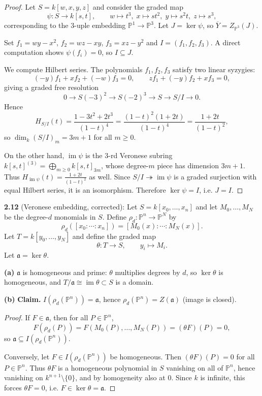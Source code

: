 \documentclass[12pt]{article}
\numberwithin{thm}{subsection}
\numberwithin{defn}{subsection}
\numberwithin{lemma}{subsection}
\numberwithin{example}{subsection}
\numberwithin{notation}{subsection}
\numberwithin{cor}{subsection}
\numberwithin{remark}{subsection}
\numberwithin{condition}{subsection}
\numberwithin{question}{subsection}
\numberwithin{construction}{subsection}
\numberwithin{construction}{subsection}
\numberwithin{construction}{subsection}
\begin{document}
\begin{proof}
Let $S=k[w,x,y,z]$ and consider the graded map
\[
\psi:S\to k[s,t],\qquad
w\mapsto t^3,\; x\mapsto st^2,\; y\mapsto s^2t,\; z\mapsto s^3,
\]
corresponding to the $3$-uple embedding $\mathbb P^1\to\mathbb P^3$.
Let $J=\ker\psi$, so $\overline Y=Z_{\mathbb P^3}(J)$.

Set $f_1=wy-x^2$, $f_2=wz-xy$, $f_3=xz-y^2$ and $I=(f_1,f_2,f_3)$.
A direct computation shows $\psi(f_i)=0$, so $I\subseteq J$.

We compute Hilbert series. The polynomials $f_1,f_2,f_3$ satisfy two linear syzygies:
\[
(-y)f_1 + x f_2 + (-w)f_3 = 0,\qquad
z f_1 + (-y)f_2 + x f_3 = 0,
\]
giving a graded free resolution
\[
0\to S(-3)^2 \to S(-2)^3 \to S \to S/I \to 0.
\]
Hence
\[
H_{S/I}(t)=\frac{1-3t^2+2t^3}{(1-t)^4}=\frac{(1-t)^2(1+2t)}{(1-t)^4}=\frac{1+2t}{(1-t)^2},
\]
so $\dim_k(S/I)_m=3m+1$ for all $m\ge 0$.

On the other hand, $\operatorname{im}\psi$ is the $3$-rd Veronese subring $k[s,t]^{(3)}=\bigoplus_{m\ge 0}k[s,t]_{3m}$,
whose degree-$m$ piece has dimension $3m+1$. Thus $H_{\operatorname{im}\psi}(t)=\frac{1+2t}{(1-t)^2}$ as well.
Since $S/I\twoheadrightarrow \operatorname{im}\psi$ is a graded surjection with equal Hilbert series, it is an isomorphism.
Therefore $\ker\psi=I$, i.e. $J=I$.
\end{proof}

\bigskip

\textbf{2.12} (Veronese embedding, corrected):
Let $S=k[x_0,\dots,x_n]$ and let $M_0,\dots,M_N$ be the degree-$d$ monomials in $S$.
Define $\rho_d:\mathbb P^n\to \mathbb P^N$ by
\[
\rho_d([x_0:\cdots:x_n])=[M_0(x):\cdots:M_N(x)].
\]
Let $T=k[y_0,\dots,y_N]$ and define the graded map
\[
\theta:T\to S,\qquad y_i\mapsto M_i.
\]
Let $\mathfrak a=\ker\theta$.

\medskip
\textbf{(a)} $\mathfrak a$ is homogeneous and prime:
$\theta$ multiplies degrees by $d$, so $\ker\theta$ is homogeneous, and $T/\mathfrak a\cong \operatorname{im}\theta\subset S$ is a domain.

\medskip
\textbf{(b)} \textbf{Claim.} $I(\rho_d(\mathbb P^n))=\mathfrak a$, hence $\rho_d(\mathbb P^n)=Z(\mathfrak a)$ (image is closed).

\begin{proof}
If $F\in\mathfrak a$, then for all $P\in\mathbb P^n$,
\[
F(\rho_d(P))=F(M_0(P),\dots,M_N(P))=(\theta F)(P)=0,
\]
so $\mathfrak a\subseteq I(\rho_d(\mathbb P^n))$.

Conversely, let $F\in I(\rho_d(\mathbb P^n))$ be homogeneous. Then $(\theta F)(P)=0$ for all $P\in\mathbb P^n$.
Thus $\theta F$ is a homogeneous polynomial in $S$ vanishing on all of $\mathbb P^n$, hence vanishing on $k^{n+1}\setminus\{0\}$,
and by homogeneity also at $0$. Since $k$ is infinite, this forces $\theta F=0$, i.e. $F\in\ker\theta=\mathfrak a$.
\end{proof}
\end{document}
